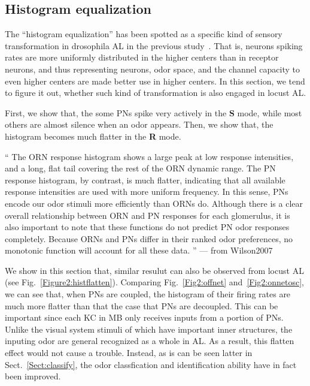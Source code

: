 \documentclass[12pt, a4paper]{article}
\begin{document}
\subsection{Histogram equalization} \label{Sect:histeq}
The ``histogram equalization'' has been spotted as a specific kind of sensory transformation in drosophila AL in the previous study~\citep{}. That is, neurons spiking rates are more uniformly distributed in the higher centers than in receptor neurons, and thus representing neurons, odor space, and the channel capacity to even higher centers are made better use in higher centers. In this section, we tend to figure it out, whether such kind of transformation is also engaged in locust AL.

First, we show that, the some PNs spike very actively in the {\bf{S}} mode, while most others are almost silence when an odor appears.
Then, we show that, the histogram becomes much flatter in the {\bf{R}} mode.

``
The ORN response histogram shows a large
peak at low response intensities, and a long, flat tail covering the rest of
the ORN dynamic range. The PN response histogram, by contrast, is
much flatter, indicating that all available response intensities are used
with more uniform frequency. In this sense, PNs encode our odor
stimuli more efficiently than ORNs do.
Although there is a clear overall relationship between ORN and PN
responses for each glomerulus, it is also important to note that these
functions do not predict PN odor responses completely. Because ORNs
and PNs differ in their ranked odor preferences, no monotonic
function will account for all these data.
'' --- from Wilson2007

We show in this section that, similar resulut can also be observed from locust AL (see Fig.~\ref{Figure2:histflatten}). Comparing Fig.~\ref{Fig2:offnet} and~\ref{Fig2:onnetosc}, we can see that, when PNs are coupled, the histogram of their firing rates are much more flatter than that the case that PNs are decoupled. This can be important since each KC in MB only receives inputs from a portion of PNs. Unlike the visual system stimuli of which have important inner structures, the inputing odor are general recognized as a whole in AL. As a result, this flatten effect would not cause a trouble. Instead, as is can be seen latter in Sect.~\ref{Sect:classify}, the odor classfication and identification ability have in fact been improved.

\end{document}

